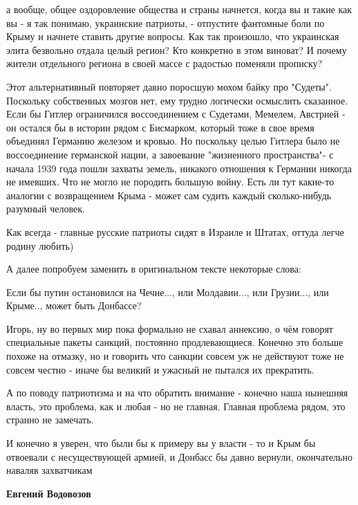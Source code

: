 \begin{itemize}
\begin{itemize}

а вообще, общее оздоровление общества и страны начнется, когда вы и такие как
вы - я так понимаю, украинские патриоты, - отпустите фантомные боли по Крыму и
начнете ставить другие вопросы. Как так произошло, что украинская элита
безвольно отдала целый регион? Кто конкретно в этом виноват? И почему жители
отдельного региона в своей массе с радостью поменяли прописку?


Этот альтернативный повторяет давно поросшую мохом байку про "Судеты".
Поскольку собственных мозгов нет, ему трудно логически осмыслить сказанное.
Если бы Гитлер ограничился воссоединением с Судетами, Мемелем, Австрией - он
остался бы в истории рядом с Бисмарком, который тоже в свое время объединял
Германию железом и кровью. Но поскольку целью Гитлера было не воссоединение
германской нации, а завоевание "жизненного пространства"- с начала 1939 года
пошли захваты земель, никакого отношения к Германии никогда не имевших. Что не
могло не породить большую войну. Есть ли тут какие-то аналогии с возвращением
Крыма - может сам судить каждый сколько-нибудь разумный человек.


Как всегда - главные русские патриоты сидят в Израиле и Штатах, оттуда легче
родину любить)

А далее попробуем заменить в оригинальном тексте некоторые слова:

Если бы путин остановился на Чечне..., или Молдавии..., или Грузии..., или
Крыме.., может быть Донбассе?


Игорь, ну во первых мир пока формально не схавал аннексию, о чём говорят
специальные пакеты санкций, постоянно продлевающиеся. Конечно это больше похоже
на отмазку, но и говорить что санкции совсем уж не действуют тоже не совсем
честно - иначе бы великий и ужасный не пытался их прекратить.

А по поводу патриотизма и на что обратить внимание - конечно наша нынешняя
власть, это проблема, как и любая - но не главная. Главная проблема рядом, это
странно не замечать.

И конечно я уверен, что были бы к примеру вы у власти - то и Крым бы отвоевали
с несуществующей армией, и Донбасс бы давно вернули, окончательно наваляв
захватчикам

\textbf{Евгений Водовозов} 


\end{itemize}
\end{itemize}

